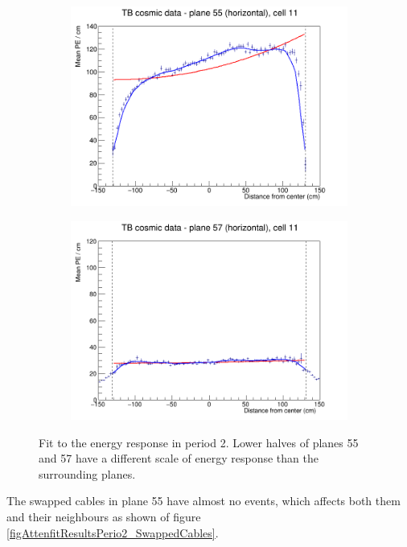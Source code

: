 \documentclass[12pt,a4paper]{article}
\begin{document}
\begin{figure}[h]
  \begin{subfigure}{0.5\textwidth}
    \includegraphics[width=\linewidth]{RelativeCalibrationResults/p2_055_011_extendedRange.png}
  \end{subfigure}
  \begin{subfigure}{0.5\textwidth}
    \includegraphics[width=\linewidth]{RelativeCalibrationResults/p2_057_011.png}
  \end{subfigure}
  \caption{Fit to the energy response in period 2. Lower halves of planes 55 and 57 have a different scale of energy response than the surrounding planes.}
  \label{figAttenfitResultsPerio2_FaultyFEB}
\end{figure}

The swapped cables in plane 55 have almost no events, which affects both them and their neighbours as shown of figure \ref{figAttenfitResultsPerio2_SwappedCables}.
\end{document}
